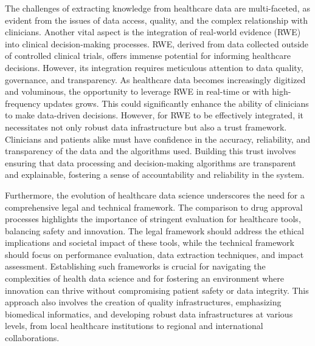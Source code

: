 


The challenges of extracting knowledge from healthcare data are multi-faceted, as evident from the issues of data access, quality, and the complex relationship with clinicians. Another vital aspect is the integration of real-world evidence (RWE) into clinical decision-making processes. RWE, derived from data collected outside of controlled clinical trials, offers immense potential for informing healthcare decisions. However, its integration requires meticulous attention to data quality, governance, and transparency. As healthcare data becomes increasingly digitized and voluminous, the opportunity to leverage RWE in real-time or with high-frequency updates grows. This could significantly enhance the ability of clinicians to make data-driven decisions. However, for RWE to be effectively integrated, it necessitates not only robust data infrastructure but also a trust framework. Clinicians and patients alike must have confidence in the accuracy, reliability, and transparency of the data and the algorithms used. Building this trust involves ensuring that data processing and decision-making algorithms are transparent and explainable, fostering a sense of accountability and reliability in the system.

Furthermore, the evolution of healthcare data science underscores the need for a comprehensive legal and technical framework. The comparison to drug approval processes highlights the importance of stringent evaluation for healthcare tools, balancing safety and innovation. The legal framework should address the ethical implications and societal impact of these tools, while the technical framework should focus on performance evaluation, data extraction techniques, and impact assessment. Establishing such frameworks is crucial for navigating the complexities of health data science and for fostering an environment where innovation can thrive without compromising patient safety or data integrity. This approach also involves the creation of quality infrastructures, emphasizing biomedical informatics, and developing robust data infrastructures at various levels, from local healthcare institutions to regional and international collaborations.

